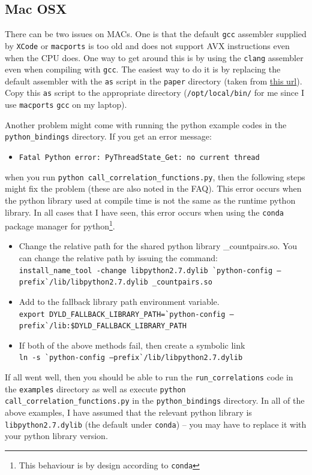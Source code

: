 \documentclass[12pt,titlepage]{article}
\newcommand{\clang}{{\texttt{clang}}\xspace}
\newcommand{\gcc}{{\texttt{gcc}}\xspace}
\begin{document}
\subsection{Mac OSX}\label{section:mac}
There can be two issues on MACs. One is that the default \gcc assembler supplied by \texttt{XCode} or \texttt{macports} is too old and does not support AVX instructions 
even when the CPU does. One way to get around this is by using the \clang assembler even when compiling with \gcc. The easiest way to do it is by replacing the 
default assembler with the \texttt{as} script in the \texttt{paper} directory (taken from \href{https://gist.github.com/ancapdev/8059572}{this url}). Copy this
\texttt{as} script to the appropriate directory (\texttt{/opt/local/bin/} for me since I use \texttt{macports} \gcc on my laptop).

Another problem might come with running the python example codes in the \texttt{python\_bindings} directory. If you get an error message:
\begin{itemize} 
\item \texttt{Fatal Python error: PyThreadState\_Get: no current thread} 
\end{itemize}
when you run \texttt{python call\_correlation\_functions.py}, then the following 
steps might fix the problem (these are also noted in the FAQ). This error occurs when the python library used at compile time is not the same 
as the runtime python library. In all cases that I have seen, this error occurs when using the \texttt{conda} package manager for python\footnote{This 
behaviour is by design according to \texttt{conda}}. 
\begin{itemize}

\item Change the relative path for the shared python library \_countpairs.so. You can change the relative path by issuing the command: \\
{\scriptsize\texttt{install\_name\_tool -change libpython2.7.dylib  \`{}python-config --prefix\`{}/lib/libpython2.7.dylib \_countpairs.so}}

\item Add to the fallback library path environment variable. \\
{\scriptsize\texttt{export DYLD\_FALLBACK\_LIBRARY\_PATH=\`{}python-config --prefix\`{}/lib:\$DYLD\_FALLBACK\_LIBRARY\_PATH}}

\item If both of the above methods fail, then create a symbolic link \\
{\scriptsize\texttt{ln -s \`{}python-config --prefix\`{}/lib/libpython2.7.dylib}}
\end{itemize}
If all went well, then you should be able to run the \texttt{run\_correlations} code in the \texttt{examples} directory as well as execute \texttt{python call\_correlation\_functions.py} 
in the \texttt{python\_bindings} directory. In all of the above examples, I have assumed that the relevant python library is \texttt{libpython2.7.dylib} (the default 
under \texttt{conda}) -- you may have to replace it with your python library version.
\end{document}
